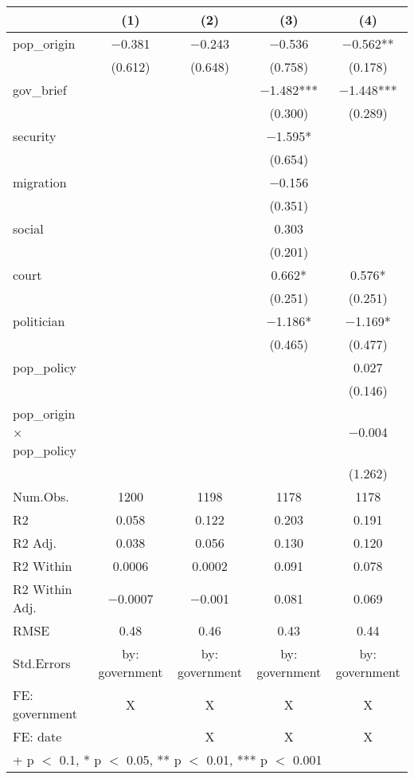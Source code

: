 \begin{table}
\centering
\begin{tabular}[t]{lcccc}
\toprule
  & (1) & (2) & (3) & (4)\\
\midrule
pop\_origin & \num{-0.381} & \num{-0.243} & \num{-0.536} & \num{-0.562}**\\
 & (\num{0.612}) & (\num{0.648}) & (\num{0.758}) & (\num{0.178})\\
gov\_brief &  &  & \num{-1.482}*** & \num{-1.448}***\\
 &  &  & (\num{0.300}) & (\num{0.289})\\
security &  &  & \num{-1.595}* & \\
 &  &  & (\num{0.654}) & \\
migration &  &  & \num{-0.156} & \\
 &  &  & (\num{0.351}) & \\
social &  &  & \num{0.303} & \\
 &  &  & (\num{0.201}) & \\
court &  &  & \num{0.662}* & \num{0.576}*\\
 &  &  & (\num{0.251}) & (\num{0.251})\\
politician &  &  & \num{-1.186}* & \num{-1.169}*\\
 &  &  & (\num{0.465}) & (\num{0.477})\\
pop\_policy &  &  &  & \num{0.027}\\
 &  &  &  & (\num{0.146})\\
pop\_origin × pop\_policy &  &  &  & \num{-0.004}\\
 &  &  &  & (\num{1.262})\\
\midrule
Num.Obs. & \num{1200} & \num{1198} & \num{1178} & \num{1178}\\
R2 & \num{0.058} & \num{0.122} & \num{0.203} & \num{0.191}\\
R2 Adj. & \num{0.038} & \num{0.056} & \num{0.130} & \num{0.120}\\
R2 Within & \num{0.0006} & \num{0.0002} & \num{0.091} & \num{0.078}\\
R2 Within Adj. & \num{-0.0007} & \num{-0.001} & \num{0.081} & \num{0.069}\\
RMSE & \num{0.48} & \num{0.46} & \num{0.43} & \num{0.44}\\
Std.Errors & by: government & by: government & by: government & by: government\\
FE: government & X & X & X & X\\
FE: date &  & X & X & X\\
\bottomrule
\multicolumn{5}{l}{\rule{0pt}{1em}+ p $<$ 0.1, * p $<$ 0.05, ** p $<$ 0.01, *** p $<$ 0.001}\\
\end{tabular}
\end{table}
